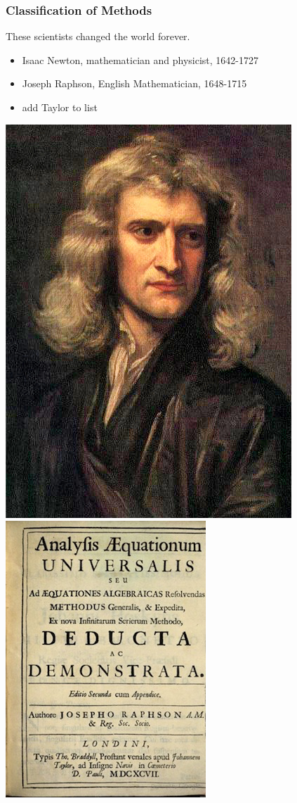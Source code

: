 \documentclass[fleqn]{beamer} %
\newcommand{\sectionIIsubsectionItitle}{Classification of Methods}
\begin{document}
			\begin{frame}[label=sectionIIsubsectionI]
				\frametitle{\sectionIIsubsectionItitle}
				\bigskip

				These scientists changed the world forever.

				\begin{itemize}
					\item Isaac Newton, mathematician and physicist, 1642-1727
					\item Joseph Raphson, English Mathematician, 1648-1715 \\
					\item add Taylor to list \\
				\end{itemize}

				\includegraphics[scale=.17]{images/newton_portrait.jpg}
				\hspace{10mm}\includegraphics[scale=.30]{images/raphson_book.jpg}


\end{frame}
\end{document}
